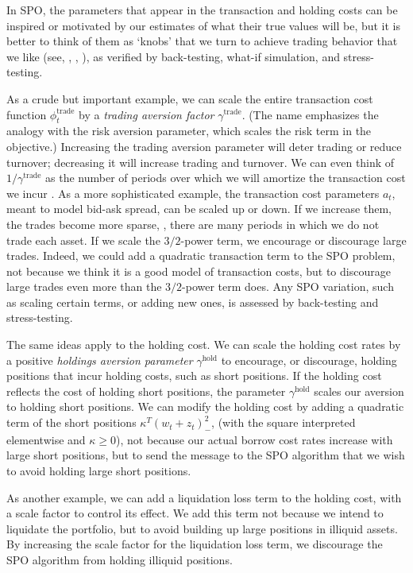 \documentclass[openany]{now}
\newcommand{\trcost}{\phi^\mathrm{trade}}
\begin{document}
In SPO, the parameters that appear in the
transaction and holding costs can be
inspired or motivated by our estimates of what their true values will be,
but it is better to think of them as `knobs' that we turn to
achieve trading behavior that we like
(see, \eg, \cite[chapter 8]{cornuejols2006optimization},
\cite{jagannathan2003risk,demiguel2009generalized,li2015sparse}),
as verified by back-testing, what-if simulation, and stress-testing.

As a crude but important example, we can scale the entire transaction cost
function $\trcost_t$ by a \emph{trading aversion factor} $\gamma^\mathrm{trade}$.
(The name emphasizes the analogy with the risk aversion parameter, which scales
the risk term in the objective.)
Increasing the trading aversion parameter will deter trading or reduce turnover;
decreasing it will increase trading and turnover.
We can even think of $1/\gamma^\mathrm{trade}$ as the number of periods
over which we will amortize the transaction cost we incur \cite{grinold2006dynamic}.
As a more sophisticated example, the transaction cost parameters $a_t$, meant to model
bid-ask spread, can be scaled up or down. If we increase them,
the trades become more sparse, \ie, there are many periods in
which we do not trade each asset.  If we scale the $3/2$-power
term, we encourage or discourage large trades.  Indeed, we could add a
quadratic transaction term to the SPO problem, not because we think it is a
good model of transaction costs, but to discourage large trades even more
than the $3/2$-power term does.  Any SPO variation, such as scaling certain terms,
or adding new ones, is assessed by back-testing and stress-testing.

The same ideas apply to the holding cost.
We can scale the holding cost rates by a positive
\emph{holdings aversion parameter} $\gamma^\mathrm{hold}$
to encourage, or discourage, holding positions that incur
holding costs, such as short positions.
If the holding cost reflects the cost of holding short positions,
the parameter $\gamma^\mathrm{hold}$ scales our aversion to
holding short positions.
We can modify the holding cost by adding a quadratic term of the short
positions $\kappa^T (w_t+z_t)_-^2$,
(with the square interpreted elementwise and $\kappa \geq 0$),
not because our actual borrow cost rates increase with large
short positions, but to send the
message to the SPO algorithm that we wish to avoid holding large short positions.

As another example, we can add a liquidation loss term to the
holding cost, with a scale factor to control its effect.
We add this term not because we intend to liquidate the portfolio, but
to avoid building up large positions in illiquid assets.
By increasing the scale factor for the liquidation loss term, we
discourage the SPO algorithm from holding illiquid positions.
%
\end{document}
